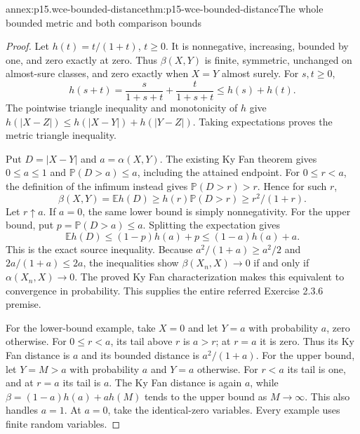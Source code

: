 \begin{annexitem}{annex:p15.wce-bounded-distance}{thm:p15-wce-bounded-distance}{The whole bounded metric and both comparison bounds}
\begin{proof}
Let \(h(t)=t/(1+t)\), \(t\geq0\).
It is nonnegative, increasing, bounded by one, and zero exactly
at zero. Thus \(\beta(X,Y)\) is finite, symmetric, unchanged
on almost-sure classes, and zero exactly when \(X=Y\) almost surely.
For \(s,t\geq0\),
\[
 h(s+t)=\frac{s}{1+s+t}+\frac{t}{1+s+t}
                                  \leq h(s)+h(t).
 \]
The pointwise triangle inequality and monotonicity of \(h\)
give \(h(|X-Z|)\leq h(|X-Y|)+h(|Y-Z|)\).
Taking expectations proves the metric triangle inequality.

Put \(D=|X-Y|\) and \(a=\alpha(X,Y)\).
The existing Ky Fan theorem gives \(0\leq a\leq1\) and
\(\mathbb P(D>a)\leq a\), including the attained endpoint.
For \(0\leq r<a\), the definition of the infimum instead gives
\(\mathbb P(D>r)>r\).
Hence for such \(r\),
\[
 \beta(X,Y)=\mathbb Eh(D)
             \geq h(r)\mathbb P(D>r)\geq r^2/(1+r).
 \]
Let \(r\uparrow a\). If \(a=0\), the same lower bound
is simply nonnegativity.
For the upper bound, put \(p=\mathbb P(D>a)\leq a\).
Splitting the expectation gives
\[
 \mathbb Eh(D)\leq (1-p)h(a)+p
                          \leq (1-a)h(a)+a.
 \]
This is the exact source inequality.
Because \(a^2/(1+a)\geq a^2/2\) and
\(2a/(1+a)\leq2a\), the inequalities show
\(\beta(X_n,X)\to0\) if and only if \(\alpha(X_n,X)\to0\).
The proved Ky Fan characterization makes this equivalent to
convergence in probability. This supplies the entire referred
Exercise 2.3.6 premise.

For the lower-bound example, take \(X=0\) and let \(Y=a\)
with probability \(a\), zero otherwise.
For \(0\leq r<a\), its tail above \(r\) is \(a>r\);
at \(r=a\) it is zero. Thus its Ky Fan distance is \(a\)
and its bounded distance is \(a^2/(1+a)\).
For the upper bound, let \(Y=M>a\) with probability \(a\)
and \(Y=a\) otherwise. For \(r<a\) its tail is one,
and at \(r=a\) its tail is \(a\).
The Ky Fan distance is again \(a\), while
\(\beta=(1-a)h(a)+a h(M)\) tends to the upper bound as
\(M\to\infty\). This also handles \(a=1\).
At \(a=0\), take the identical-zero variables.
Every example uses finite random variables.
\end{proof}
\end{annexitem}

